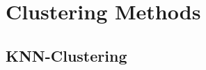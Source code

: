 \documentclass[../main.tex]{subfiles}
\begin{document}
\section{Clustering Methods} \label{Clustering Methods}


\subsection{KNN-Clustering}
\end{document}
